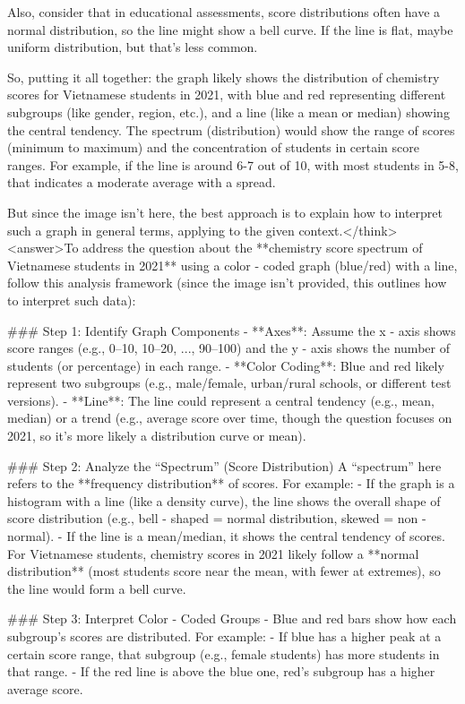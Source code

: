 Also, consider that in educational assessments, score distributions often have a normal distribution, so the line might show a bell curve. If the line is flat, maybe uniform distribution, but that's less common. 

So, putting it all together: the graph likely shows the distribution of chemistry scores for Vietnamese students in 2021, with blue and red representing different subgroups (like gender, region, etc.), and a line (like a mean or median) showing the central tendency. The spectrum (distribution) would show the range of scores (minimum to maximum) and the concentration of students in certain score ranges. For example, if the line is around 6-7 out of 10, with most students in 5-8, that indicates a moderate average with a spread. 

But since the image isn't here, the best approach is to explain how to interpret such a graph in general terms, applying to the given context.</think><answer>To address the question about the **chemistry score spectrum of Vietnamese students in 2021** using a color - coded graph (blue/red) with a line, follow this analysis framework (since the image isn’t provided, this outlines how to interpret such data):  


### Step 1: Identify Graph Components  
- **Axes**: Assume the x - axis shows score ranges (e.g., 0–10, 10–20, ..., 90–100) and the y - axis shows the number of students (or percentage) in each range.  
- **Color Coding**: Blue and red likely represent two subgroups (e.g., male/female, urban/rural schools, or different test versions).  
- **Line**: The line could represent a central tendency (e.g., mean, median) or a trend (e.g., average score over time, though the question focuses on 2021, so it’s more likely a distribution curve or mean).  


### Step 2: Analyze the “Spectrum” (Score Distribution)  
A “spectrum” here refers to the **frequency distribution** of scores. For example:  
- If the graph is a histogram with a line (like a density curve), the line shows the overall shape of score distribution (e.g., bell - shaped = normal distribution, skewed = non - normal).  
- If the line is a mean/median, it shows the central tendency of scores. For Vietnamese students, chemistry scores in 2021 likely follow a **normal distribution** (most students score near the mean, with fewer at extremes), so the line would form a bell curve.  


### Step 3: Interpret Color - Coded Groups  
- Blue and red bars show how each subgroup’s scores are distributed. For example:  
  - If blue has a higher peak at a certain score range, that subgroup (e.g., female students) has more students in that range.  
  - If the red line is above the blue one, red’s subgroup has a higher average score.  


